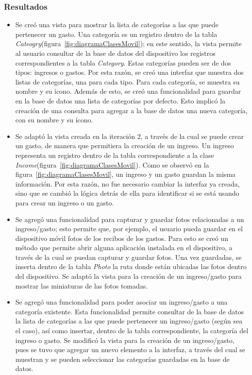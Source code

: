 \subsubsection{Resultados}
\begin{itemize}
\item Se creó una vista para mostrar la lista de categorías a las que puede pertenecer un gasto. Una categoría es un registro dentro de la tabla \textit{Cateogry}(figura~\ref{fig:diagramaClasesMovil}); en este sentido, la vista permite al usuario consultar de la base de datos del dispositivo los registros correspondientes a la tabla \textit{Category}. Estas categorías pueden ser de dos tipos: ingresos o gastos. Por esta razón, se creó una interfaz que muestra dos listas de categorías, una para cada tipo. Para cada categoría, se muestra su nombre y su ícono. Además de esto, se creó una funcionalidad para guardar en la base de datos una lista de categorías por defecto. Esto implicó la creación de una consulta para agregar a la base de datos una nueva categoría, con su nombre y su ícono.
\item Se adaptó la vista creada en la iteración 2, a través de la cual se puede crear un gasto, de manera que permitiera la creación de un ingreso. Un ingreso representa un registro dentro de la tabla correspondiente a la clase \textit{Income}(figura~\ref{fig:diagramaClasesMovil}). Como se observó en la figura~\ref{fig:diagramaClasesMovil}, un ingreso y un gasto guardan la misma información. Por esta razón, no fue necesario cambiar la interfaz ya creada, sino que se cambió la lógica detrás de ella para identificar si se está usando para crear un ingreso o un gasto.
\item Se agregó una funcionalidad para capturar y guardar fotos relacionadas a un ingreso/gasto; esto permite que, por ejemplo, el usuario pueda guardar en el dispositivo móvil fotos de los recibos de los gastos. Para esto se creó un método que permite abrir alguna aplicación instalada en el dispositivo, a través de la cual se puedan capturar y guardar fotos. Una vez guardadas, se inserta dentro de la tabla \textit{Photo} la ruta donde están ubicadas las fotos dentro del dispositivo. Se adaptó la vista para la creación de un ingreso/gasto para mostrar las miniaturas de las fotos tomadas.%
\item Se agregó una funcionalidad para poder asociar un ingreso/gasto a una categoría existente. Esta funcionalidad permite consultar de la base de datos la lista de categorías a las que puede pertenecer un ingreso/gasto (según sea el caso), así como insertar, dentro de la tabla correspondiente, la categoría del ingreso o gasto. Se modificó la vista para la creación de un ingreso/gasto, pues se tuvo que agregar un nuevo elemento a la interfaz, a través del cual se muestran y se pueden seleccionar las categorías guardadas en la base de datos.  


\end{itemize}
